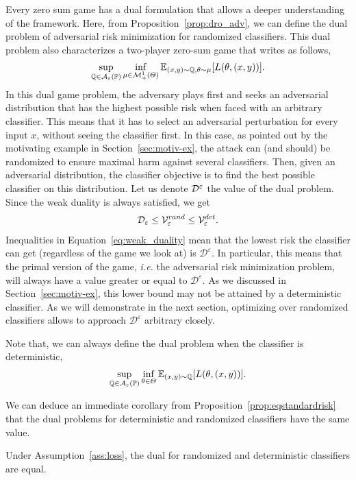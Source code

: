 Every zero sum game has a dual formulation that allows a deeper understanding of the framework. Here, from Proposition~\ref{prop:dro_adv}, we can define the dual problem of adversarial risk minimization for randomized classifiers. This dual problem also characterizes a two-player zero-sum game that writes as follows,
\begin{align}
    \sup_{\QQ\in\mathcal{A}_{\varepsilon}(\PP)}\inf_{\mu\in\mathcal{M}^1_+(\Theta)}\mathbb{E}_{(x,y)\sim\QQ,\theta\sim\mu}\left[\loss(\theta,(x,y))\right].
\label{eq:dual_pb}
\end{align}
In this dual game problem, the adversary plays first and seeks an adversarial distribution that has the highest possible risk when faced with an arbitrary classifier. This means that it has to select an adversarial perturbation for every input $x$, without seeing the classifier first. In this case, as pointed out by the motivating example in Section~\ref{sec:motiv-ex}, the attack can (and should) be randomized to ensure maximal harm against several classifiers. Then, given an adversarial distribution, the classifier objective is to find the best possible classifier on this distribution. Let us denote $\mathcal{D}^\varepsilon$ the value of the dual problem. Since the weak duality is always satisfied, we get
\begin{align}
\label{eq:weak_duality}
\mathcal{D}_\varepsilon\leq \mathcal{V}^{rand}_\varepsilon\leq \mathcal{V}^{det}_\varepsilon.
\end{align}
Inequalities in Equation~\eqref{eq:weak_duality} mean that the lowest risk the classifier can get (regardless of the game we look at) is $\mathcal{D}^\varepsilon$. In particular, this means that the primal version of the game, \emph{i.e.} the adversarial risk minimization problem, will always have a value greater or equal to $\mathcal{D}^\varepsilon$. As we discussed in Section~\ref{sec:motiv-ex}, this lower bound may not be attained by a deterministic classifier. As we will demonstrate in the next section, optimizing over randomized classifiers allows to approach $\mathcal{D}^\varepsilon$ arbitrary closely.

Note that, we can always define the dual problem when the classifier is deterministic, \begin{align*}
    \sup_{\QQ\in\mathcal{A}_{\varepsilon}(\PP)}\inf_{\theta\in\Theta}\mathbb{E}_{(x,y)\sim\QQ}\left[\loss(\theta,(x,y))\right].
\end{align*}


We can deduce an immediate corollary from Proposition~\ref{prop:eqstandardrisk}
that the dual problems for deterministic and randomized classifiers have the same value.
\begin{corollary}
Under Assumption~\ref{ass:loss}, the dual for randomized and deterministic classifiers are equal.
\end{corollary}


